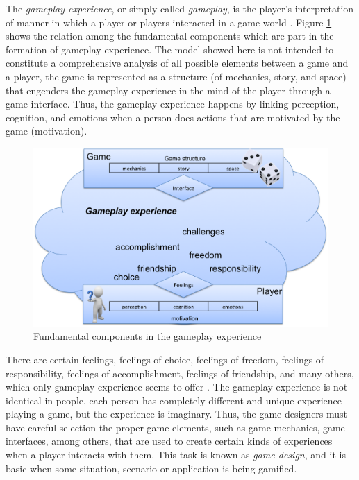 The \emph{gameplay experience}, or simply called \emph{gameplay}, is the player's interpretation of manner in which a player or players interacted in a game world \cite{SalenZimmerman2004, Lindley2004, MayraErmi2005}. Figure \ref{fig:gameplay-experience} shows the relation among the fundamental components which are part in the formation of gameplay experience. The model showed here is not intended to constitute a comprehensive analysis of all possible elements between a game and a player, the game is represented as a structure (of mechanics, story, and space) that engenders the gameplay experience in the mind of the player through a game interface. Thus, the gameplay experience happens by linking perception, cognition, and emotions when a person does actions that are motivated by the game (motivation).

\begin{figure}[htb]
 \caption{Fundamental components in the gameplay experience}
 \label{fig:gameplay-experience}
 \centering
 \includegraphics[width=1\textwidth]{images/chap-general-background/gameplay-experience.png}
\end{figure}

There are certain feelings, feelings of choice, feelings of freedom, feelings of responsibility, feelings of accomplishment, feelings of friendship, and many others, which only gameplay experience seems to offer \cite{Schell2008}. The gameplay experience is not identical in people, each person has completely different and unique experience playing a game, but the experience is imaginary. Thus, the game designers must have careful selection the proper game elements, such as game mechanics, game interfaces, among others, that are used to create certain kinds of experiences when a player interacts with them. This task is known as \emph{game design}, and it is basic when some situation, scenario or application is being gamified.

